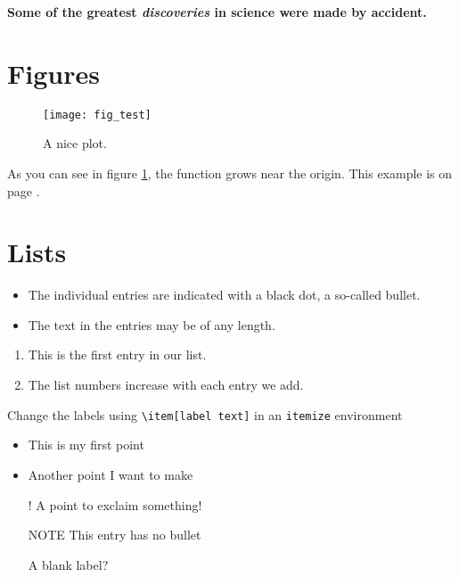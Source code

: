 \documentclass[12pt, a4paper]{article} %
\begin{document}
        \textbf{Some of the greatest \emph{discoveries}
        in science were made by accident.}

    \section{Figures}
        \begin{figure}[h]
            \centering
            \texttt{[image: fig\_test]}   %
            \caption
            {
                A nice plot.
            }
            \label{fig:test}
        \end{figure}

        As you can see in figure \ref{fig:test},
        the function grows near the origin.
        This example is on page \pageref{fig:test}.

    \section{Lists}
        \begin{itemize}                                        %
            \item The individual entries are indicated with
                  a black dot, a so-called bullet.
            \item The text in the entries may be of any length.
        \end{itemize}

        \begin{enumerate}                                      %
            \item This is the first entry in our list.
            \item The list numbers increase with each entry we add.
        \end{enumerate}

        Change the labels using \verb|\item[label text]| in an \texttt{itemize} environment
        \begin{itemize}
            \item This is my first point
            \item Another point I want to make
            \item[!] A point to exclaim something!
            \item[NOTE] This entry has no bullet
            \item[] A blank label?
        \end{itemize}
\end{document}
